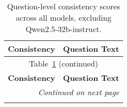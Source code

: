 \begin{longtable}{p{}p{}}
    \caption{Question-level consistency scores across all models, excluding Qwen2.5-32b-instruct. \label{tab:question_consistency_exclude_qwen}} \\
    \hline
    \textbf{Consistency} & \textbf{Question Text} \\
    \hline
    \endfirsthead
    
    \hline
    \multicolumn{2}{c}{Table~\ref{tab:question_consistency_exclude_qwen} (continued)} \\
    \hline
    \textbf{Consistency} & \textbf{Question Text} \\
    \hline
    \endhead
    
    \hline
    \multicolumn{2}{r}{\textit{Continued on next page}} \\
    \endfoot
    

\end{longtable}
